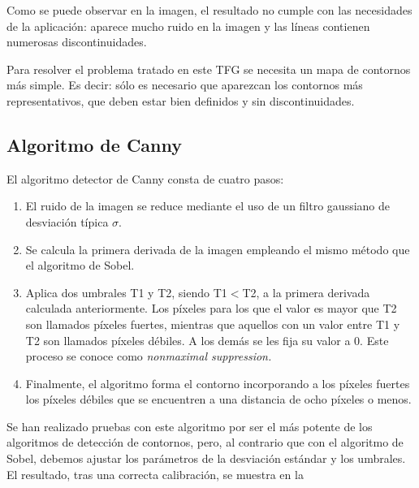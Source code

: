 Como se puede observar en la imagen, el resultado no cumple con las necesidades de la aplicación: aparece mucho ruido en la imagen y las líneas contienen numerosas discontinuidades. 

Para resolver el problema tratado en este \ac{TFG} se necesita un mapa de contornos más simple. Es decir: sólo es necesario que aparezcan los contornos más representativos, que deben estar bien definidos y sin discontinuidades.

\subsection{Algoritmo de Canny}
El algoritmo detector de Canny consta de cuatro pasos:

\begin{enumerate}
\item El ruido de la imagen se reduce mediante el uso de un filtro gaussiano de  desviación típica $\sigma$.

\item Se calcula la primera derivada de la imagen empleando el mismo método que el algoritmo de Sobel.

\item Aplica dos umbrales T1 y T2, siendo T1$<$T2, a la primera derivada calculada anteriormente. Los píxeles para los que el valor es mayor que T2 son llamados píxeles fuertes, mientras que aquellos con un valor entre T1 y T2 son llamados píxeles débiles. A los demás se les fija su valor a 0. Este proceso se conoce como \emph{nonmaximal suppression.}


\item Finalmente, el algoritmo forma el contorno incorporando a los píxeles fuertes los píxeles débiles que se encuentren a una distancia de ocho píxeles o menos. 
\end{enumerate}

Se han realizado pruebas con este algoritmo por ser el más potente de los algoritmos de detección de contornos, pero, al contrario que con el algoritmo de Sobel, debemos ajustar los parámetros de la desviación estándar  y los umbrales. El resultado, tras una correcta calibración, se muestra en la \\


